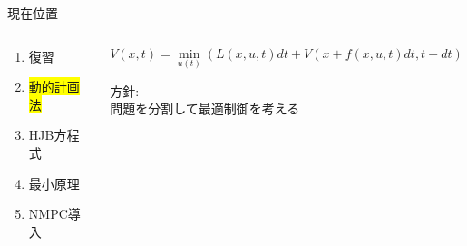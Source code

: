 \documentclass[twocolumn, dvipdfmx,12pt]{beamer}
\begin{document}
    \begin{frame}{現在位置}
        \footnotesize
        \begin{columns}
            \begin{column}{.35\textwidth}
                \begin{enumerate}
                    \item 復習
                    \item \colorbox{yellow}{動的計画法}
                    \item HJB方程式
                    \item 最小原理
                    \item NMPC導入
                \end{enumerate}
            \end{column}
    
            \begin{column}{.7\textwidth}
                \fontsize{7.5pt}{3.5pt}\selectfont
                \begin{screen}
                    \begin{equation*}
                        V(x, t) = \min_{u(t)} \left( L(x, u, t) dt + V \left( x + f(x, u, t) dt, t + dt \right) \right)
                    \end{equation*}
                \end{screen}
                \footnotesize
                方針:\\
                \qquad 問題を分割して最適制御を考える \\

            \end{column}
        \end{columns}
    \end{frame}
\end{document}
